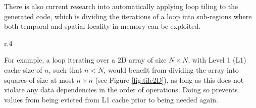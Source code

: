 \noindent There is also current research into automatically applying loop tiling to the generated code, which is dividing the iterations of a loop into sub-regions where both temporal and spatial locality in memory can be exploited. \par

\begin{wrapfigure}{r}{.4\textwidth}
  \centering
  \caption{2D Loop Tiling}
  \label{fig:tile2D}
  \hspace{-1em}
\end{wrapfigure}
For example, a loop iterating over a 2D array of size $N \times N$, with Level 1 (L1) cache size of $n$, such that $n < N$, would benefit from dividing the array into squares of size at most $n \times n$ (see Figure \ref{fig:tile2D}), as long as this does not violate any data dependencies in the order of operations. Doing so prevents values from being evicted from L1 cache prior to being needed again.\par
